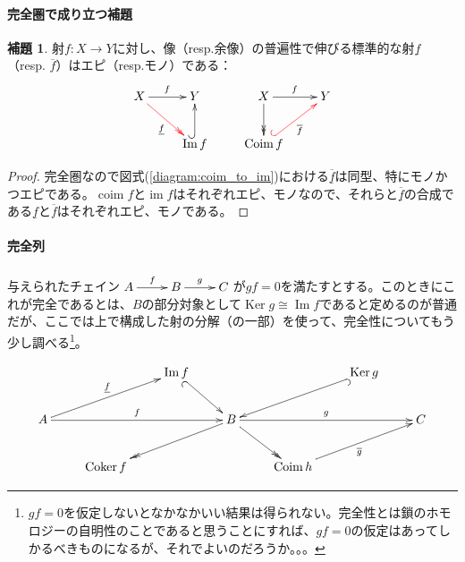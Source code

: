 \documentclass[a4paper,11pt]{jsarticle}
\theoremstyle{definition}
\newtheorem{lem}[thm]{補題}
\DeclareMathOperator{\Ima}{\mathrm{Im}}
\DeclareMathOperator{\im}{\mathrm{im}}
\DeclareMathOperator{\Coker}{\mathrm{Coker}}
\DeclareMathOperator{\Coim}{\mathrm{Coim}}
\DeclareMathOperator{\coim}{\mathrm{coim}}
\DeclareMathOperator{\Ker}{\mathrm{Ker}}
\newcommand{\ou}[1]{\overline{\underline{#1}}}
\begin{document}
\paragraph{完全圏で成り立つ補題}
\begin{lem}
射$f\colon X\to Y$に対し、像（resp.余像）の普遍性で伸びる標準的な射$\underline{f}$（resp. $\overline{f}$）はエピ（resp.モノ）である：\[\xymatrix{
  X\ar[r]^f\ar@[red]@{->>}[rd]_{\underline{f}}&Y&X\ar[r]^{f}\ar@{->>}[d]&Y\\
  &\Ima f\ar@{^(->}[u]&\Coim f\ar@{^(->}@[red][ur]_{\overline{f}}&
}\]
\end{lem}
\begin{proof}
  完全圏なので図式(\ref{diagram:coim_to_im})における$\ou{f}$は同型、特にモノかつエピである。$\coim f$と$\im f$はそれぞれエピ、モノなので、それらと$\ou{f}$の合成である$\underline{f}$と$\overline{f}$はそれぞれエピ、モノである。
\end{proof}
\paragraph{完全列}
与えられたチェイン$\xymatrix{A\ar[r]^f&B\ar[r]^g&C}$が$gf=0$を満たすとする。このときにこれが完全であるとは、$B$の部分対象として$\Ker g\cong \Ima f$であると定めるのが普通だが、ここでは上で構成した射の分解（の一部）を使って、完全性についてもう少し調べる\footnote{$gf=0$を仮定しないとなかなかいい結果は得られない。完全性とは鎖のホモロジーの自明性のことであると思うことにすれば、$gf=0$の仮定はあってしかるべきものになるが、それでよいのだろうか。。。}。

\[
\xymatrix{
&&\Ima f\ar@{_(->}[rd]&&&\Ker g\ar@{^(->}[lld]&\\
A\ar[rrr]^{f}\ar[urr]^{\underline{f}}&&&B\ar[rrr]^{g}\ar@{->>}[lld]\ar@{->>}[rd]&&&C\\
&\Coker f&&&\Coim h\ar[urr]_{\overline{g}}&&
}
\]



\end{document}

